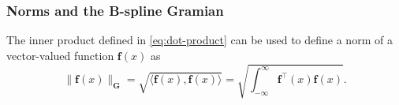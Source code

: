 %     


\subsubsection{Norms and the B-spline Gramian}\label{sec:norms}
The inner product defined in \cref{eq:dot-product} can be used to define a norm of a vector-valued function $\mathbf f(x)$ as
\begin{equation}
    \label{eq:norm}
    \|\mathbf f(x)\|_\mathbf G = \sqrt{\langle\mathbf f(x), \mathbf f(x)\rangle} = \sqrt{\int_{-\infty}^\infty \mathbf f^\top(x) \mathbf f(x)}.
\end{equation}

